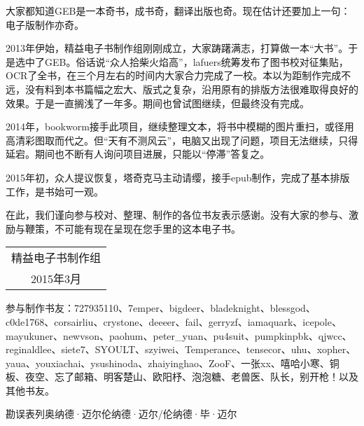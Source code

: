 大家都知道GEB是一本奇书，成书奇，翻译出版也奇。现在估计还要加上一句：电子版制作亦奇。

2013年伊始，精益电子书制作组刚刚成立，大家踌躇满志，打算做一本“大书”。于是选中了GEB。俗话说“众人拾柴火焰高”，lafuers统筹发布了图书校对征集贴，OCR了全书，在三个月左右的时间内大家合力完成了一校。本以为距制作完成不远，没有料到本书篇幅之宏大、版式之复杂，沿用原有的排版方法很难取得良好的效果。于是一直搁浅了一年多。期间也曾试图继续，但最终没有完成。

2014年，bookworm接手此项目，继续整理文本，将书中模糊的图片重扫，或径用高清彩图取而代之。但“天有不测风云”，电脑又出现了问题，项目无法继续，只得延宕。期间也不断有人询问项目进展，只能以“停滞”答复之。

2015年初，众人提议恢复，塔奇克马主动请缨，接手epub制作，完成了基本排版工作，是书始可一观。

在此，我们谨向参与校对、整理、制作的各位书友表示感谢。没有大家的参与、激励与鞭策，不可能有现在呈现在您手里的这本电子书。

\medskip

\hfill
\begin{tabular}{c@{\qquad}}
精益电子书制作组\\
2015年3月
\end{tabular}

\vfill

\normalfont
\textsf{参与制作书友}：727935110、7emper、bigdeer、bladeknight、blessgod、c0de1768、corsairliu、crystone、deeeer、fail、gerryzf、iamaquark、icepole、mayukuner、newvson、paohum、peter\_yuan、pu4suit、pumpkinpbk、qjwcc、reginaldlee、siete7、SYOULT、szyiwei、Temperance、tensecor、uhu、xopher、yaua、youxiachai、ysushinoda、zhaiyinghao、ZooF、一张xx、嘻哈小寒、铜板、夜空、忘了邮箱、明客楚山、欧阳杼、泡泡糖、老兽医、队长，别开枪！以及其他书友。

\textsf{勘误表}\quad 列奥纳德·迈尔\quad 伦纳德·迈尔/伦纳德·毕·迈尔

\clearpage
\endgroup

